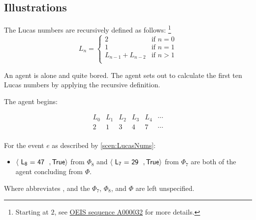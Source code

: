 \subsection{Illustrations}
\label{cha:requs:firstIllu}

\begin{note}
  \begin{scenario}
    \label{scen:LucasNums}
    The Lucas numbers are recursively defined as follows:%
    \footnote{
      Starting at \(2\), see \hyperlink{cite.OEIS.:aa}{OEIS sequence A000032} for more details.
    }
    \[
      L_{n} = \left\{
        \begin{array}{ll}
          2 & \text{if } n = 0 \\
          1 & \text{if } n = 1 \\
          L_{n-1} + L_{n-2} & \text{if } n > 1 \\
        \end{array}
      \right.
    \]

    An agent is alone and quite bored.
    The agent sets out to calculate the first ten Lucas numbers by applying the recursive definition.

    The agent begins:

    \[
    \begin{array}{cccccc}
      L_{0} & L_{1} & L_{2} & L_{3} & L_{4} & \cdots \\
      \hline
      2 & 1 & 3 & 4 & 7 & \cdots \\
    \end{array}
    \]
  \end{scenario}

  \begin{observation}%
    \label{obs:LucasRequ}%
    For the event \(e\) as described by \autoref{scen:LucasNums}:
    \begin{itemize}
    \item
      \(\pv{\propI{L\textsubscript{8} = 47}}{\valI{True}}\) from \(\Phi_{8}\) and \(\pv{\propI{L\textsubscript{7} = 29}}{\valI{True}}\) from \(\Phi_{7}\) are both  of the agent concluding  from \(\Phi\).
    \end{itemize}
    Where  abbreviates , and the  \(\Phi_{7}\), \(\Phi_{8}\), and \(\Phi\) are left unspecified.
  \end{observation}


\end{note}
